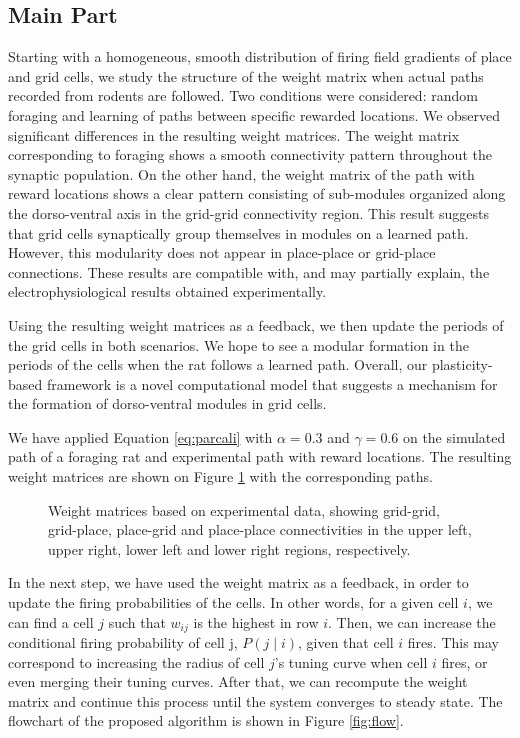 \documentclass[11pt, letterpaper, onecolumn]{article}
\begin{document}
\subsection{Main Part}
Starting with a homogeneous, smooth distribution of firing field gradients of place and grid cells, we study the structure of the weight matrix when actual paths recorded from rodents are followed. Two conditions were considered: random foraging and learning of paths between specific rewarded locations. We observed significant differences in the resulting weight matrices. The weight matrix corresponding to foraging shows a smooth connectivity pattern throughout the synaptic population. On the other hand, the weight matrix of the path with reward locations shows a clear pattern consisting of sub-modules organized along the dorso-ventral axis in the grid-grid connectivity region. This result suggests that grid cells synaptically group themselves in modules on a learned path. However, this modularity does not appear in place-place or grid-place connections. These results are compatible with, and may partially explain, the electrophysiological results obtained experimentally.

Using the resulting weight matrices as a feedback, we then update the periods of the grid cells in both scenarios. We hope to see a modular formation in the periods of the cells when the rat follows a learned path. Overall, our plasticity-based framework is a novel computational model that suggests a mechanism for the formation of dorso-ventral modules in grid cells.

We have applied Equation \ref{eq:parcali} with $ \alpha = 0.3 $ and $ \gamma = 0.6 $ on the simulated path of a foraging rat and experimental path with reward locations. The resulting weight matrices are shown on Figure \ref{fig:wjean} with the corresponding paths.

\begin{figure}[H]
\centering
\caption{Weight matrices based on experimental data, showing grid-grid, grid-place, place-grid and place-place connectivities in the upper left, upper right, lower left and lower right regions, respectively.}
   \label{fig:wjean}
\end{figure}

In the next step, we have used the weight matrix as a feedback, in order to update the firing probabilities of the cells. In other words, for a given cell $ i $, we can find a cell $ j $ such that $ w_{ij} $ is the highest in row $ i $. Then, we can increase the conditional firing probability of cell j, $ P(j \mid i) $, given that cell $ i $ fires. This may correspond to increasing the radius of cell $ j $'s tuning curve when cell $ i $ fires, or even merging their tuning curves. After that, we can recompute the weight matrix and continue this process until the system converges to steady state. The flowchart of the proposed algorithm is shown in Figure \ref{fig:flow}.
\end{document}
